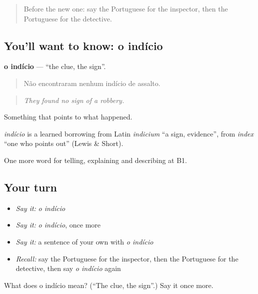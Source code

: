 \label{lesson:PT-C294-indicio}



\begin{quote}
Before the new one: say the Portuguese for the inspector, then the Portuguese for the detective.
\end{quote}

\subsection*{You'll want to know: o indício}
\textbf{o indício} — \textquotedblleft{}the clue, the sign\textquotedblright{}.

\begin{quote}
Não encontraram nenhum indício de assalto.
\end{quote}

\begin{quote}
\emph{They found no sign of a robbery.}
\end{quote}

Something that points to what happened.

\begin{cousinweb}
\emph{indício} is a learned borrowing from Latin \emph{indicium} \textquotedblleft{}a sign, evidence\textquotedblright{}, from \emph{index} \textquotedblleft{}one who points out\textquotedblright{} (Lewis \& Short).
\end{cousinweb}

\begin{grammarlens}[title={What you've built}]
One more word for telling, explaining and describing at B1.
\end{grammarlens}

\subsection*{Your turn}
\begin{itemize}
\raggedright
  \item \emph{Say it:} \emph{o indício}
  \item \emph{Say it:} \emph{o indício}, once more
  \item \emph{Say it:} a sentence of your own with \emph{o indício}
  \item \emph{Recall:} say the Portuguese for the inspector, then the Portuguese for the detective, then say \emph{o indício} again
\end{itemize}

\begin{tcolorbox}[breakable,colback=teal!4,colframe=teal!35!black,title={Before you move on}]
What does o indício mean? (\textquotedblleft{}The clue, the sign\textquotedblright{}.) Say it once more.
\end{tcolorbox}
